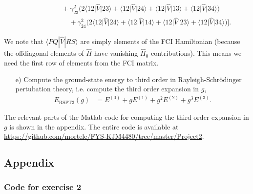 \documentclass[a4paper]{article}
\newcommand{\nn}{\nonumber}
\begin{document}
\begin{align}
& \ \ \ \ \ \ \ \ \ \ \ \ \ \ \ \ \ \ \ \ \ \ + \gamma_{23}^2\Big(2\big\langle 12 \big| \hat V \big| 23\big\rangle + \big\langle 12 \big| \hat V \big| 24\big\rangle + \big\langle 12 \big| \hat V \big| 13\big\rangle + \big\langle 12 \big| \hat V \big| 34\big\rangle \Big) \nn\\ 
& \ \ \ \ \ \ \ \ \ \ \ \ \ \ \ \ \ \ \ \ \ \ \ \ \ \ \ + \gamma_{24}^2\Big(2\big\langle 12 \big| \hat V \big| 24\big\rangle + \big\langle 12 \big| \hat V \big| 14\big\rangle + \big\langle 12 \big| \hat V \big| 23\big\rangle + \big\langle 12 \big| \hat V \big| 34\big\rangle \Big) \bigg].
\end{align}

We note that $\langle PQ|\hat V | RS\rangle $ are simply elements of the FCI Hamiltonian (because the offdiagonal elements of $\hat H$ have vanishing $\hat H_0$ contributions). This means we need the first row of elements from the FCI matrix.

\begin{exframe}
\begin{itemize}
  \item[e)] Compute the ground-state energy to third order in Rayleigh-Schrödinger pertubation theory, i.e. compute the third order expansion in $g$, 
  \begin{align}
  E_\text{RSPT3}(g) &= E^{(0)} + gE^{(1)} + g^2E^{(2)} + g^3E^{(3)}.
  \end{align}
\end{itemize}
\end{exframe}
The relevant parts of the {\sc Matlab} code for computing the third order expansion in $g$ is shown in the appendix. The entire code is available at \url{https://github.com/mortele/FYS-KJM4480/tree/master/Project2}.




\subsection*{Appendix}
\subsubsection*{Code for exercise 2}

\end{document}
